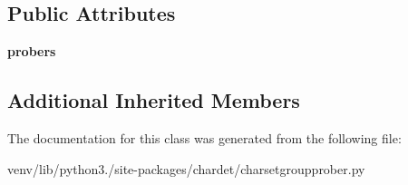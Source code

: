 \subsection*{Public Attributes}
\begin{DoxyCompactItemize}
\item 
\mbox{\label{classchardet_1_1charsetgroupprober_1_1_char_set_group_prober_ac85c833dfa58cd89857a257fb8a3beb6}} 
{\bfseries probers}
\end{DoxyCompactItemize}
\subsection*{Additional Inherited Members}


The documentation for this class was generated from the following file\+:\begin{DoxyCompactItemize}
\item 
venv/lib/python3./site-\/packages/chardet/charsetgroupprober.\+py\end{DoxyCompactItemize}
